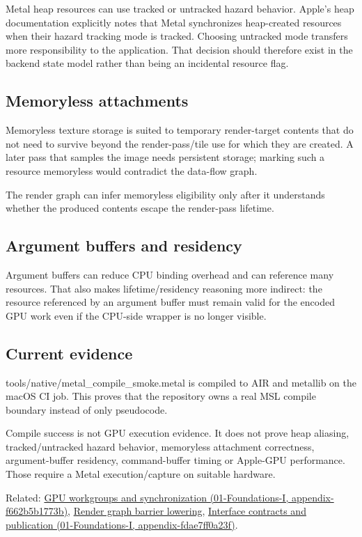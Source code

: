 Metal heap resources can use tracked or untracked hazard behavior. Apple's heap documentation explicitly notes that Metal synchronizes heap-created resources when their hazard tracking mode is tracked. Choosing untracked mode transfers more responsibility to the application. That decision should therefore exist in the backend state model rather than being an incidental resource flag.

\subsection{Memoryless attachments}\label{appendix-563b2cb23fc3-memoryless-attachments}

Memoryless texture storage is suited to temporary render-target contents that do not need to survive beyond the render-pass/tile use for which they are created. A later pass that samples the image needs persistent storage; marking such a resource memoryless would contradict the data-flow graph.

The render graph can infer memoryless eligibility only after it understands whether the produced contents escape the render-pass lifetime.

\subsection{Argument buffers and residency}\label{appendix-563b2cb23fc3-argument-buffers-and-residency}

Argument buffers can reduce CPU binding overhead and can reference many resources. That also makes lifetime/residency reasoning more indirect: the resource referenced by an argument buffer must remain valid for the encoded GPU work even if the CPU-side wrapper is no longer visible.

\subsection{Current evidence}\label{appendix-563b2cb23fc3-current-evidence}

tools/native/metal\_compile\_smoke.metal is compiled to AIR and metallib on the macOS CI job. This proves that the repository owns a real MSL compile boundary instead of only pseudocode.

Compile success is not GPU execution evidence. It does not prove heap aliasing, tracked/untracked hazard behavior, memoryless attachment correctness, argument-buffer residency, command-buffer timing or Apple-GPU performance. Those require a Metal execution/capture on suitable hardware.

Related: \href{../01-Foundations-I/main.pdf\#nameddest=appendix-f662b5b1773b}{GPU workgroups and synchronization (01-Foundations-I, appendix-f662b5b1773b)}, \hyperref[appendix-0fc95374cb7e]{Render graph barrier lowering}, \href{../01-Foundations-I/main.pdf\#nameddest=appendix-fdae7ff0a23f}{Interface contracts and publication (01-Foundations-I, appendix-fdae7ff0a23f)}.
